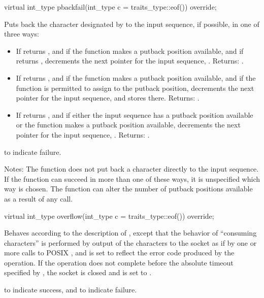 \begin{itemdecl}
virtual int_type pbackfail(int_type c = traits_type::eof()) override;
\end{itemdecl}

\begin{itemdescr}
\pnum
\effects Puts back the character designated by  to the input sequence, if possible, in one of three ways:

\begin{itemize}
\item
If  returns , and if the function makes a putback position available, and if  returns , decrements the next pointer for the input sequence, . Returns: .

\item
If  returns , and if the function makes a putback position available, and if the function is permitted to assign to the putback position, decrements the next pointer for the input sequence, and stores  there. Returns: .

\item
If  returns , and if either the input sequence has a putback position available or the function makes a putback position available, decrements the next pointer for the input sequence, . Returns: .
\end{itemize}

\pnum
\returns {} to indicate failure.

\pnum
Notes: The function does not put back a character directly to the input sequence. If the function can succeed in more than one of these ways, it is unspecified which way is chosen. The function can alter the number of putback positions available as a result of any call.
\end{itemdescr}

\begin{itemdecl}
virtual int_type overflow(int_type c = traits_type::eof()) override;
\end{itemdecl}

\begin{itemdescr}
\pnum
\effects Behaves according to the description of , except that the behavior of ``consuming characters'' is performed by output of the characters to the socket as if by one or more calls to POSIX , and  is set to reflect the error code produced by the operation. If the operation does not complete before the absolute timeout specified by , the socket is closed and  is set to .

\pnum
\returns {} to indicate success, and  to indicate failure.
\end{itemdescr}

